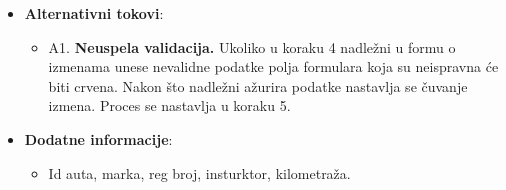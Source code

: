 \begin{itemize}
  \item \textbf{Alternativni tokovi}:
      \begin{itemize}
        \item A1. \textbf{Neuspela validacija.}
        Ukoliko u koraku 4 nadležni u formu o izmenama unese nevalidne podatke polja formulara koja su neispravna će biti crvena.
        Nakon što nadležni ažurira podatke nastavlja se čuvanje izmena. Proces se nastavlja u koraku 5.
      \end{itemize}
      
  \item \textbf{Dodatne informacije}:
      \begin{itemize}
        \item Id auta, marka, reg broj, insturktor, kilometraža. 
      \end{itemize}
\end{itemize}